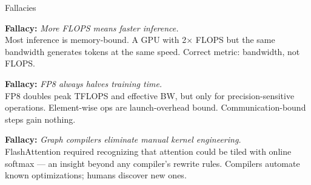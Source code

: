 \documentclass[aspectratio=169, 12pt]{beamer}
\begin{document}
\begin{frame}{Fallacies}

\small
\textbf{Fallacy:} \textit{More FLOPS means faster inference.}\\
{\footnotesize Most inference is memory-bound. A GPU with 2$\times$ FLOPS but the same bandwidth generates tokens at the same speed. Correct metric: bandwidth, not FLOPS.}

\vspace{0.15cm}
\textbf{Fallacy:} \textit{FP8 always halves training time.}\\
{\footnotesize FP8 doubles peak TFLOPS and effective BW, but only for precision-sensitive operations. Element-wise ops are launch-overhead bound. Communication-bound steps gain nothing.}

\vspace{0.15cm}
\textbf{Fallacy:} \textit{Graph compilers eliminate manual kernel engineering.}\\
{\footnotesize FlashAttention required recognizing that attention could be tiled with online softmax --- an insight beyond any compiler's rewrite rules. Compilers automate known optimizations; humans discover new ones.}

\end{frame}
\end{document}

